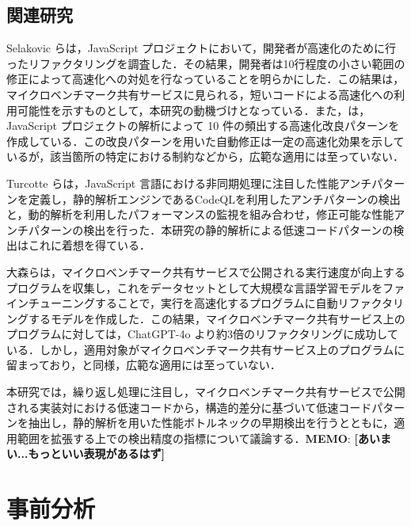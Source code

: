 \documentclass[submit,techrep,noauthor]{ipsj}
\newcommand{\memo}[1]{\colorbox{magenta!30}{{\bf MEMO}:}{\color{red!50} {\textbf{[#1]}}}}
\begin{document}


\subsection{関連研究}

Selakovic ら\cite{jsRefac}は，JavaScript プロジェクトにおいて，開発者が高速化のために行ったリファクタリングを調査した．その結果，開発者は10行程度の小さい範囲の修正によって高速化への対処を行なっていることを明らかにした．この結果は，マイクロベンチマーク共有サービスに見られる，短いコードによる高速化への利用可能性を示すものとして，本研究の動機づけとなっている．また，\cite{jsRefac}は，JavaScript プロジェクトの解析によって 10 件の頻出する高速化改良パターンを作成している．この改良パターンを用いた自動修正は一定の高速化効果を示しているが，該当箇所の特定における制約などから，広範な適用には至っていない．

Turcotte ら\cite{DrAsync}は，JavaScript 言語における非同期処理に注目した性能アンチパターンを定義し，静的解析エンジンであるCodeQL\cite{ql}を利用したアンチパターンの検出と，動的解析を利用したパフォーマンスの監視を組み合わせ，修正可能な性能アンチパターンの検出を行った．本研究の静的解析による低速コードパターンの検出はこれに着想を得ている．

大森ら\cite{omori}は，マイクロベンチマーク共有サービスで公開される実行速度が向上するプログラムを収集し，これをデータセットとして大規模な言語学習モデルをファインチューニングすることで，実行を高速化するプログラムに自動リファクタリングするモデルを作成した．この結果，マイクロベンチマーク共有サービス上のプログラムに対しては，ChatGPT-4o より約3倍のリファクタリングに成功している．しかし，適用対象がマイクロベンチマーク共有サービス上のプログラムに留まっており，\cite{jsRefac}と同様，広範な適用には至っていない．

本研究では，繰り返し処理に注目し，マイクロベンチマーク共有サービスで公開される実装対における低速コードから，構造的差分に基づいて低速コードパターンを抽出し，静的解析を用いた性能ボトルネックの早期検出を行うとともに，適用範囲を拡張する上での検出精度の指標について議論する．\memo{あいまい...もっといい表現があるはず}


\section{事前分析}
\label{sec:pre-analysis}
\end{document}
